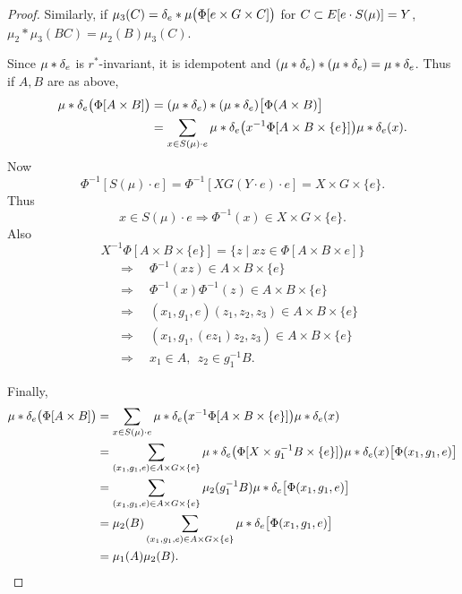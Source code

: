 \begin{proof}
Similarly, if $\mu_3(C) = \delta_e * \mu \big( \Phi[e \times G \times C]
\big)$ for $C \subset E[e \cdot S(\mu)] = Y$, $\mu_2 * \mu_3(BC) = \mu_2(B) \mu_3(C)$.

Since $\mu * \delta_e$ is $r^*$-invariant, it is idempotent and $(\mu * \delta_e) * (\mu * \delta_e) = \mu * \delta_e$.  
Thus if $A,B$ are as above,
\[
\begin{aligned}
       \mu * \delta_e \big( \Phi[A \times B] \big) &= (\mu * \delta_e)
               * (\mu * \delta_e) \big[ \Phi(A \times B) \big]        \\
       &= \sum_{x \in S(\mu) \cdot e}
               \mu * \delta_e \big( x^{-1}
               \Phi [A \times B \times \{ e \} ] \big) \mu * \delta_e(x).
\end{aligned}
\]
Now
\[
     \Phi^{-1} [S(\mu) \cdot e] = \Phi^{-1} [XG(Y \cdot e) \cdot e]
          = X \times G \times \{ e \}.
\]
Thus
\[
     x \in S(\mu) \cdot e \Rightarrow \Phi^{-1}(x) \in X \times G \times \{ e \}.
\]
Also
\[
     X^{-1} \Phi[A \times B \times \{ e \}]
          = \{ z \mid xz \in \Phi[A \times B \times e] \}
\]
\[
\begin{aligned}
       &\Rightarrow \quad \Phi^{-1}(xz) \in A \times B \times \{ e \}          \\
       &\Rightarrow \quad \Phi^{-1}(x) \Phi^{-1}(z) \in A \times B \times \{ e \}  \\
       &\Rightarrow \quad (x_1,g_1,e)(z_1,z_2,z_3)
                    \in A \times B \times \{ e \}                      \\
       &\Rightarrow \quad (x_1,g_1,(ez_1) z_2,z_3)
                    \in A \times B \times \{ e \}                      \\
       &\Rightarrow \quad x_1 \in A, \ \ z_2 \in g^{-1}_1 B.
\end{aligned}
\]

     Finally,
\[
\begin{aligned}
       \mu * \delta_e \big( \Phi[A \times B] \big)
          &= \sum_{x \in S(\mu) \cdot e} \mu * \delta_e
               \big( x^{-1} \Phi[A \times B \times \{ e \}] \big)
               \mu * \delta_e(x)                                  \\
          &= \sum_{(x_1,g_1,e) \in A \times G \times \{ e \}}
               \mu * \delta_e
               \big( \Phi[ X \times g^{-1}_1B \times \{ e \}] \big)
               \mu * \delta_e(x) \big[ \Phi(x_1,g_1,e) \big]      \\
          &= \sum_{(x_1,g_1,e) \in A \times G \times \{ e \}}
               \mu_2 (g^{-1}_1B) \mu * \delta_e \big[ \Phi
               (x_1,g_1,e) \big]                               \\
          &= \mu_2(B) \sum_{(x_1,g_1,e) \in A \times G \times \{ e \}}
               \mu * \delta_e \big[ \Phi(x_1,g_1,e) \big]         \\
          &= \mu_1(A) \mu_2(B).
\end{aligned}
\]


\end{proof}
